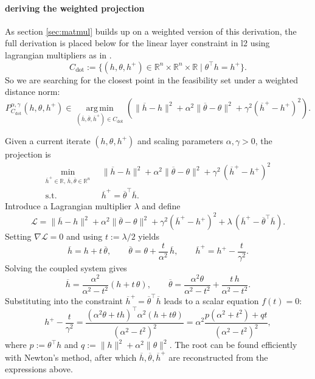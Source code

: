 \documentclass{article}
\theoremstyle{plain}
\theoremstyle{definition}
\theoremstyle{remark}
\begin{document}
\paragraph{deriving the weighted projection}
As section \ref{sec:matmul} builds up on a weighted version of this derivation, the full derivation is placed below for the linear layer constraint in l2 using lagrangian multipliers as in \cite{elser2019learning}.
\begin{equation}
  \label{eq:constraint-dot}
  C_{\mathrm{dot}} := \{(h, \theta, h^+)\in \mathbb{R}^n \times \mathbb{R}^n \times \mathbb{R} \mid \theta^\top h = h^+\}.
\end{equation}
So we are searching for the closest point in the feasibility set under a weighted distance norm:
\[
P_{C_{\mathrm{dot}}}^{\alpha, \gamma}(h, \theta, h^+) \in \operatorname*{arg\,min}_{(\overline{h}, \overline{\theta}, \overline{h}^+) \in C_{\mathrm{dot}}} \left( \lVert \overline{h}-h \rVert^2 + \alpha^2\lVert \overline{\theta}-\theta \rVert^2 + \gamma^2(\overline{h}^+ - h^+)^2 \right).
\]

Given a current iterate $(h, \theta, h^+)$ and scaling parameters $\alpha, \gamma>0$, the projection is
\begin{equation}
  \label{eq:proj-bilinear-layer}
  \begin{aligned}
    \min_{\overline{h}^+\in\mathbb{R},\,\overline{h},\overline{\theta}\in\mathbb{R}^n}\; &\ \lVert \overline{h}-h\rVert^2 + \alpha^2\lVert \overline{\theta}-\theta\rVert^2 + \gamma^2\,(\overline{h}^+-h^+)^2\\
    \text{s.t. } &\ \overline{h}^+ = \overline{\theta}^\top \overline{h}.
  \end{aligned}
\end{equation}
Introduce a Lagrangian multiplier $\lambda$ and define
\[
  \mathcal{L} = \lVert \overline{h}-h\rVert^2 + \alpha^2\lVert \overline{\theta}-\theta\rVert^2 + \gamma^2(\overline{h}^+-h^+)^2 + \lambda\,(\overline{h}^+ - \overline{\theta}^\top \overline{h}).
\]
Setting $\nabla \mathcal{L} = 0$ and using $t:=\lambda/2$ yields
\[
  \overline{h} = h + t\,\overline{\theta},\qquad \overline{\theta} = \theta + \frac{t}{\alpha^2}\,\overline{h},\qquad \overline{h}^+ = h^+ - \frac{t}{\gamma^2}.
\]
Solving the coupled system gives
\[
  \overline{h} = \frac{\alpha^2}{\alpha^2-t^2}(h + t\,\theta),\qquad \overline{\theta} = \frac{\alpha^2\theta }{\alpha^2-t^2} +  \frac{t\,h}{\alpha^2-t^2} .
\]
Substituting into the constraint $\overline{h}^+=\overline{\theta}^\top \overline{h}$ leads to a scalar equation $f(t)=0$:
\[
  h^+ - \frac{t}{\gamma^2} 
  = \frac{(\alpha^2\theta+t h)^\top \alpha^2(h+t \theta)}{(\alpha^2-t^2)^2} 
  = \alpha^2 \frac{p(\alpha^2+t^2)+q t}{(\alpha^2-t^2)^2},
\]
where $p:=\theta^\top h$ and $q:=\lVert h\rVert^2 + \alpha^2\lVert \theta\rVert^2$.
The root can be found efficiently with Newton's method, after which $\overline{h}, \overline{\theta}, \overline{h}^+$ are reconstructed from the expressions above.
 
\end{document}

